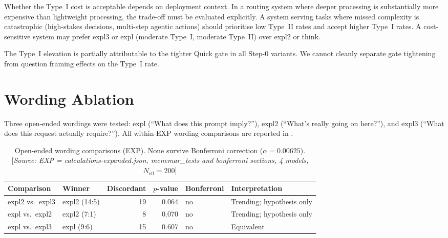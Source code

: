 \documentclass[11pt,a4paper]{article}
\begin{document}
Whether the Type~I cost is acceptable depends on deployment context.  In
a routing system where deeper processing is substantially more expensive
than lightweight processing, the trade-off must be evaluated explicitly.
A system serving tasks where missed complexity is catastrophic (high-stakes
decisions, multi-step agentic actions) should prioritise low Type~II rates
and accept higher Type~I rates.  A cost-sensitive system may prefer
\textsf{expl3} or \textsf{expl} (moderate Type~I, moderate Type~II) over
\textsf{expl2} or \textsf{think}.

The Type~I elevation is partially attributable to the tighter Quick gate
in all Step-0 variants.  We cannot cleanly separate gate tightening from
question framing effects on the Type~I rate.

\section{Wording Ablation}
\label{sec:wording}

Three open-ended wordings were tested: \textsf{expl} (``What does this
prompt imply?''), \textsf{expl2} (``What's really going on here?''), and
\textsf{expl3} (``What does this request actually require?'').  All within-EXP
wording comparisons are reported in .

\begin{table}[htbp]
\centering
\caption{Open-ended wording comparisons (EXP).
  None survive Bonferroni correction ($\alpha = 0.00625$).
  [\emph{Source: EXP = calculations-expanded.json,
  mcnemar\_tests and bonferroni sections,
  4 models, $N_\text{eff} = 200$}]}
\label{tab:wording}
\smallskip
\begin{tabular}{@{}llrrll@{}}
\toprule
Comparison & Winner & Discordant & $p$-value & Bonferroni & Interpretation \\
\midrule
\textsf{expl2} vs.\ \textsf{expl3}
  & expl2 (14:5) & 19 & 0.064 & no & Trending; hypothesis only \\
\textsf{expl} vs.\ \textsf{expl2}
  & expl2 (7:1) & 8 & 0.070 & no & Trending; hypothesis only \\
\textsf{expl} vs.\ \textsf{expl3}
  & expl (9:6)  & 15 & 0.607 & no & Equivalent \\
\bottomrule
\end{tabular}
\end{table}
\end{document}
